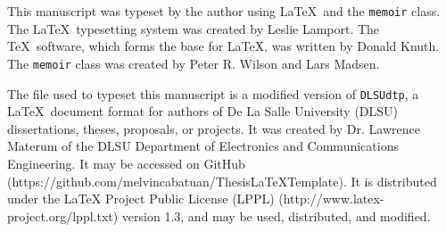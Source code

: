 This manuscript was typeset by the author using \LaTeX\  and the \texttt{memoir} class.
The \LaTeX\ typesetting system was created by Leslie Lamport.
The \TeX\ software, which forms the base for \LaTeX, was written by Donald Knuth.
The \texttt{memoir} class was created by Peter R. Wilson and Lars Madsen.

The file used to typeset this manuscript is a modified version of \texttt{DLSUdtp}, a \LaTeX\  document format for authors of De La Salle University (DLSU) dissertations, theses, proposals, or projects.
It was created by Dr. Lawrence Materum of the DLSU Department of Electronics and Communications Engineering.
It may be accessed on GitHub (https://github.com/melvincabatuan/ThesisLaTeXTemplate).
It is distributed under the LaTeX Project Public License (LPPL) (http://www.latex-project.org/lppl.txt) version 1.3, and may be used, distributed, and modified. 